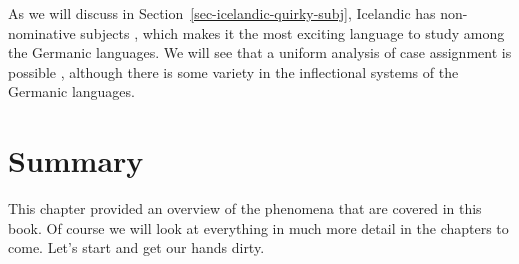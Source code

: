 As we will discuss in Section~\ref{sec-icelandic-quirky-subj}, Icelandic has non-nominative subjects \citep{ZMT85a}, which makes it the most
exciting language to study among the Germanic languages. We will see that a uniform analysis of case
assignment is possible \citep*{YMJ87}, although there is some variety in the inflectional systems of the Germanic languages.


\section{Summary}

This chapter provided an overview of the phenomena that are covered in this book. Of course we will
look at everything in much more detail in the chapters to come. Let's start and get our hands dirty.





